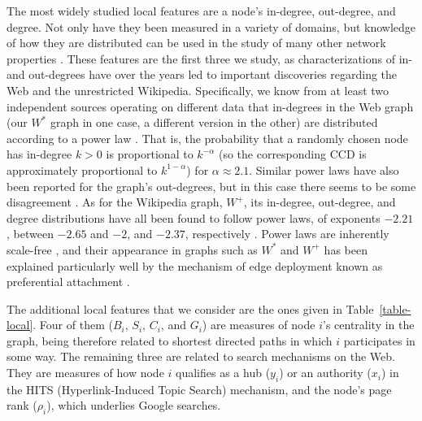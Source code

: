 \documentclass{article}
\begin{document}
The most widely studied local features are a node's in-degree, out-degree, and
degree. Not only have they been measured in a variety of domains, but knowledge
of how they are distributed can be used in the study of many other network
properties \cite{nsw01}. These features are the first three we study, as
characterizations of in- and out-degrees have over the years led to important
discoveries regarding the Web and the unrestricted Wikipedia. Specifically, we
know from at least two independent sources operating on different data that
in-degrees in the Web graph (our $W^*$ graph in one case, a different version in
the other) are distributed according to a power law
\cite{ajb99,bkmrrstw00,dllm04}. That is, the probability that a randomly chosen
node has in-degree $k>0$ is proportional to $k^{-\alpha}$ (so the corresponding
CCD is approximately proportional to $k^{1-\alpha}$) for $\alpha\approx 2.1$.
Similar power laws have also been reported for the graph's out-degrees, but in
this case there seems to be some disagreement \cite{dllm04}. As for the
Wikipedia graph, $W^+$, its in-degree, out-degree, and degree distributions have
all been found to follow power laws, of exponents $-2.21$, between $-2.65$ and
$-2$, and $-2.37$, respectively \cite{cscbdlc06,zbsd06}. Power laws are
inherently scale-free \cite{n05}, and their appearance in graphs such as $W^*$
and $W^+$ has been explained particularly well by the mechanism of edge
deployment known as preferential attachment \cite{p76,ba99,baj00,cscbdlc06}.

The additional local features that we consider are the ones given in
Table~\ref{table-local}. Four of them ($B_i$, $S_i$, $C_i$, and $G_i$) are
measures of node $i$'s centrality in the graph, being therefore related to
shortest directed paths in which $i$ participates in some way. The remaining
three are related to search mechanisms on the Web. They are measures of how node
$i$ qualifies as a hub ($y_i$) or an authority ($x_i$) in the HITS
(Hyperlink-Induced Topic Search) mechanism, and the node's page rank ($\rho_i$),
which underlies Google searches.

\begin{table}
\centering
\caption{Additional local features for node $i$. $\sigma_{jk}$ is the number of
shortest directed paths that lead from $j$ to $k$, while $\sigma_{jk}(i)$ counts
only the ones that go through $i$.}
\label{table-local}

\end{table}
\end{document}
